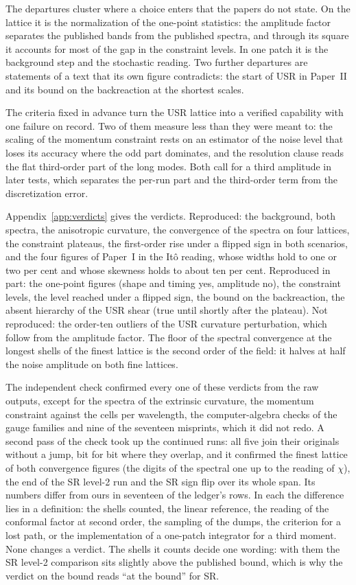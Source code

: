 \documentclass[aps,prd,twocolumn,10pt,superscriptaddress,nofootinbib,longbibliography,floatfix]{revtex4-2}
\newcommand{\Pone}{Paper~I}
\newcommand{\Ptwo}{Paper~II}
\begin{document}
The departures cluster where a choice enters that the papers do not state. On the lattice it is the normalization of the one-point statistics: the amplitude factor separates the published bands from the published spectra, and through its square it accounts for most of the gap in the constraint levels. In one patch it is the background step and the stochastic reading. Two further departures are statements of a text that its own figure contradicts: the start of USR in \Ptwo{} and its bound on the backreaction at the shortest scales.

The criteria fixed in advance turn the USR lattice into a verified capability with one failure on record. Two of them measure less than they were meant to: the scaling of the momentum constraint rests on an estimator of the noise level that loses its accuracy where the odd part dominates, and the resolution clause reads the flat third-order part of the long modes. Both call for a third amplitude in later tests, which separates the per-run part and the third-order term from the discretization error.

Appendix~\ref{app:verdicts} gives the verdicts. Reproduced: the background, both spectra, the anisotropic curvature, the convergence of the spectra on four lattices, the constraint plateaus, the first-order rise under a flipped sign in both scenarios, and the four figures of \Pone{} in the It\^o reading, whose widths hold to one or two per cent and whose skewness holds to about ten per cent. Reproduced in part: the one-point figures (shape and timing yes, amplitude no), the constraint levels, the level reached under a flipped sign, the bound on the backreaction, the absent hierarchy of the USR shear (true until shortly after the plateau). Not reproduced: the order-ten outliers of the USR curvature perturbation, which follow from the amplitude factor. The floor of the spectral convergence at the longest shells of the finest lattice is the second order of the field: it halves at half the noise amplitude on both fine lattices.

The independent check confirmed every one of these verdicts from the raw outputs, except for the spectra of the extrinsic curvature, the momentum constraint against the cells per wavelength, the computer-algebra checks of the gauge families and nine of the seventeen misprints, which it did not redo. A second pass of the check took up the continued runs: all five join their originals without a jump, bit for bit where they overlap, and it confirmed the finest lattice of both convergence figures (the digits of the spectral one up to the reading of $\chi$), the end of the SR level-2 run and the SR sign flip over its whole span. Its numbers differ from ours in seventeen of the ledger's rows. In each the difference lies in a definition: the shells counted, the linear reference, the reading of the conformal factor at second order, the sampling of the dumps, the criterion for a lost path, or the implementation of a one-patch integrator for a third moment. None changes a verdict. The shells it counts decide one wording: with them the SR level-2 comparison sits slightly above the published bound, which is why the verdict on the bound reads ``at the bound'' for SR.
\end{document}
